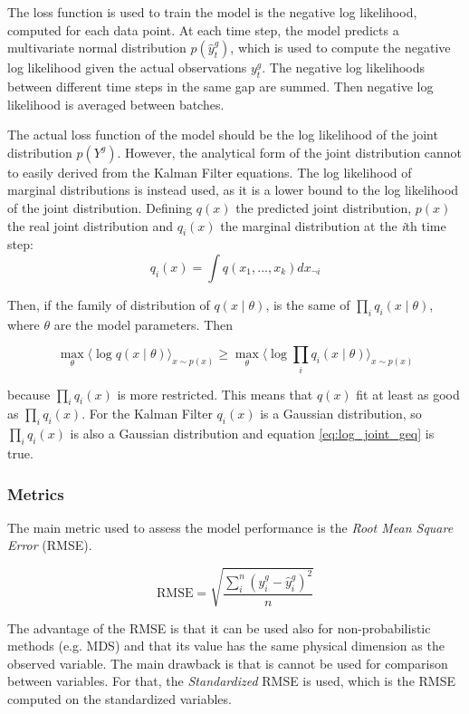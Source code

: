 \documentclass{article}
\newcommand{\E}[1]{\langle #1 \rangle} %
\begin{document}
The loss function is used to train the model is the negative log likelihood, computed for each data point. At each time step, the model predicts a multivariate normal distribution $p(\hat{y}^g_t)$, which is used to compute the negative log likelihood given the actual observations $y_t^g$. The negative log likelihoods between different time steps in the same gap are summed. Then negative log likelihood is averaged between batches.

The actual loss function of the model should be the log likelihood of the joint distribution $p(Y^g)$. However, the analytical form of the joint distribution cannot to easily derived from the Kalman Filter equations. The log likelihood of marginal distributions is instead used, as it is a lower bound to the log likelihood of the joint distribution. Defining $q(x)$ the predicted joint distribution, $p(x)$ the real joint distribution and $q_i(x)$ the marginal distribution at the \textit{i}th time step:
\begin{equation}
    q_i(x) = \int q(x_1, ..., x_k)dx_{\neg i}
\end{equation}

Then, if the family of distribution of $q(x \mid \theta)$,  is the same of $\prod_i q_i(x \mid \theta)$, where $\theta$ are the model parameters. Then

\begin{equation}\label{eq:log_joint_geq}
    \max_\theta \E{\log q(x\mid \theta)}_{x \sim p(x)} \geq \max_\theta \E{\log \prod_i q_i(x\mid \theta)}_{x \sim p(x)}
\end{equation}

because $\prod_i q_i(x)$ is more restricted. This means that $q(x)$ fit at least as good as $\prod_i q_i(x)$.
For the Kalman Filter $q_i(x)$ is a Gaussian distribution, so $\prod_i q_i(x)$ is also a Gaussian distribution and equation \ref{eq:log_joint_geq} is true.

\subsubsection{Metrics}

The main metric used to assess the model performance is the \emph{Root Mean Square Error} (RMSE). 

\begin{equation}
    \text{RMSE} = \sqrt{\frac{\sum_i^n (y^g_i - \hat{y}^g_i)^2}{n}}
\end{equation}

The advantage of the RMSE is that it can be used also for non-probabilistic methods (e.g. MDS) and that its value has the same physical dimension as the observed variable. The main drawback is that is cannot be used for comparison between variables. For that, the \emph{Standardized} RMSE is used, which is the RMSE computed on the standardized variables.
\end{document}
